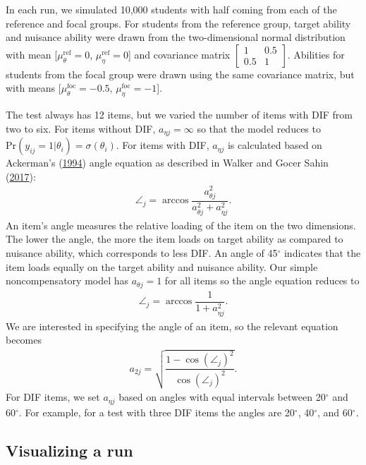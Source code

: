 \documentclass[
  11pt,
]{article}
\begin{document}
In each run, we simulated 10,000 students with half coming from each of the reference and focal groups. For students from the reference group, target ability and nuisance ability were drawn from the two-dimensional normal distribution with mean {[}\(\mu_\theta^\text{ref} = 0\), \(\mu_\eta^\text{ref} = 0\){]} and covariance matrix \(\begin{bmatrix} 1 & 0.5 \\ 0.5 & 1 \end{bmatrix}\). Abilities for students from the focal group were drawn using the same covariance matrix, but with means {[}\(\mu_\theta^\text{foc} = -0.5\), \(\mu_\eta^\text{foc} = -1\){]}.

The test always has 12 items, but we varied the number of items with DIF from two to six. For items without DIF, \(a_{\eta j} = \infty\) so that the model reduces to \(\text{Pr}(y_{ij} = 1 | \theta_i) = \sigma(\theta_i)\). For items with DIF, \(a_{\eta j}\) is calculated based on Ackerman's (\protect\hyperlink{ref-ackerman1994using}{1994}) angle equation as described in Walker and Gocer Sahin (\protect\hyperlink{ref-walker2017using}{2017}):
\begin{align}
\angle_j = \arccos \dfrac{a_{\theta j}^2}{a_{\theta j}^2 + a_{\eta j}^2}.
\end{align}
An item's angle measures the relative loading of the item on the two dimensions. The lower the angle, the more the item loads on target ability as compared to nuisance ability, which corresponds to less DIF. An angle of 45\(^\circ\) indicates that the item loads equally on the target ability and nuisance ability. Our simple noncompensatory model has \(a_{\theta j} = 1\) for all items so the angle equation reduces to
\begin{align}
\angle_j = \arccos \dfrac{1}{1 + a_{\eta j}^2}.
\end{align}
We are interested in specifying the angle of an item, so the relevant equation becomes
\begin{align}
a_{2j} = \sqrt{\dfrac{1 - \cos(\angle_j)^2}{\cos(\angle_j)^2}}.
\end{align}
For DIF items, we set \(a_{\eta j}\) based on angles with equal intervals between 20\(^\circ\) and 60\(^\circ\). For example, for a test with three DIF items the angles are 20\(^\circ\), 40\(^\circ\), and 60\(^\circ\).

\hypertarget{visualizing-a-run}{%
\subsection{Visualizing a run}\label{visualizing-a-run}}
\end{document}
